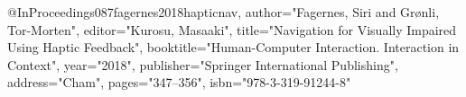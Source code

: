 @InProceedings{087fagernes2018hapticnav,
author="Fagernes, Siri
and Gr{\o}nli, Tor-Morten",
editor="Kurosu, Masaaki",
title="Navigation for Visually Impaired Using Haptic Feedback",
booktitle="Human-Computer Interaction. Interaction in Context",
year="2018",
publisher="Springer International Publishing",
address="Cham",
pages="347--356",
isbn="978-3-319-91244-8"
}
